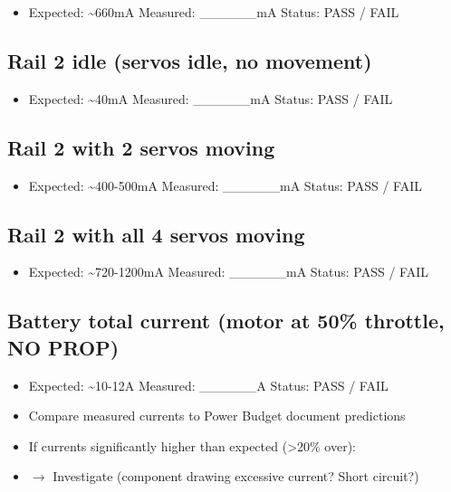 \documentclass[11pt,letterpaper]{article}
\begin{document}
\begin{itemize}
  \item Expected: \textasciitilde{}660mA    Measured: \_\_\_\_\_\_mA    Status: PASS / FAIL
\end{itemize}

\subsection{Rail 2 idle (servos idle, no movement)}

\begin{itemize}
  \item Expected: \textasciitilde{}40mA    Measured: \_\_\_\_\_\_mA    Status: PASS / FAIL
\end{itemize}

\subsection{Rail 2 with 2 servos moving}

\begin{itemize}
  \item Expected: \textasciitilde{}400-500mA    Measured: \_\_\_\_\_\_mA    Status: PASS / FAIL
\end{itemize}

\subsection{Rail 2 with all 4 servos moving}

\begin{itemize}
  \item Expected: \textasciitilde{}720-1200mA    Measured: \_\_\_\_\_\_mA    Status: PASS / FAIL
\end{itemize}

\subsection{Battery total current (motor at 50\% throttle, NO PROP)}

\begin{itemize}
  \item Expected: \textasciitilde{}10-12A    Measured: \_\_\_\_\_\_A    Status: PASS / FAIL
\end{itemize}

\begin{itemize}
  \item Compare measured currents to Power Budget document predictions
  \item If currents significantly higher than expected (>20\% over):
  \item $\rightarrow$ Investigate (component drawing excessive current? Short circuit?)
\end{itemize}
\end{document}
